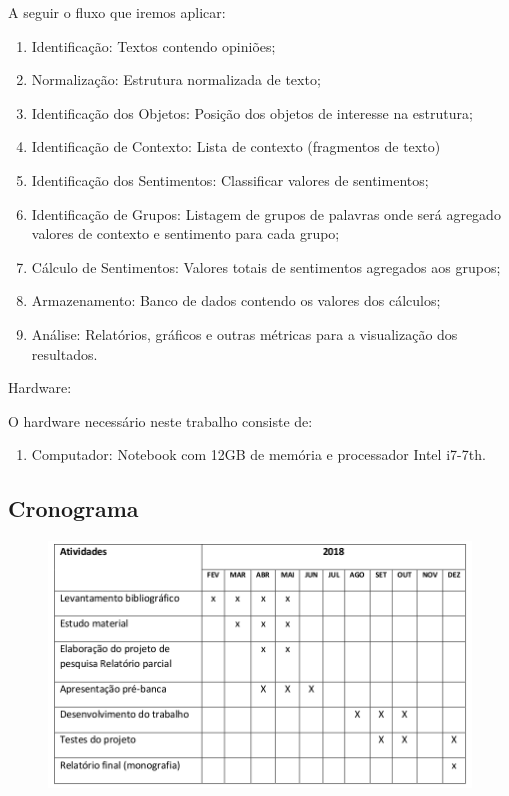 \documentclass[12pt, a4paper]{article}
\begin{document}
\bigskip 
A seguir o fluxo que iremos aplicar:

\smallskip
\begin{enumerate}
\item Identificação: Textos contendo opiniões;
\item Normalização: Estrutura normalizada de texto;
\item Identificação dos Objetos: Posição dos objetos de interesse na estrutura;
\item Identificação de Contexto: Lista de contexto (fragmentos de texto)
\item Identificação dos Sentimentos: Classificar valores de sentimentos;
\item Identificação de Grupos: Listagem de grupos de palavras onde será agregado valores de contexto e sentimento para cada grupo;
\item Cálculo de Sentimentos: Valores totais de sentimentos agregados aos grupos;
\item Armazenamento: Banco de dados contendo os valores dos cálculos;
\item Análise: Relatórios, gráficos e outras métricas para a visualização dos resultados.
\end{enumerate}

\newpage
Hardware:

\smallskip
O hardware necessário neste trabalho consiste de:

\smallskip
\begin{enumerate}
\item Computador: Notebook com 12GB de memória e processador Intel i7-7th.
\end{enumerate}
\subsection{Cronograma}
\begin{figure}[H]
\centering
\includegraphics[width=1\textwidth]{cronograma.png}
\end{figure}
\end{document}
